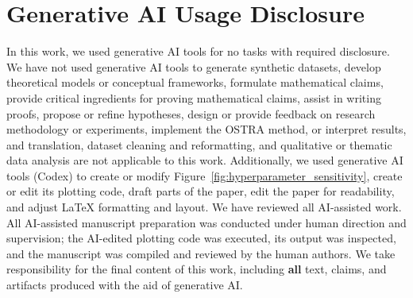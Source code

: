 \section*{Generative AI Usage Disclosure}

In this work, we used generative AI tools for no tasks with required
disclosure. We have not used generative AI tools to generate synthetic
datasets, develop theoretical models or conceptual frameworks, formulate
mathematical claims, provide critical ingredients for proving mathematical
claims, assist in writing proofs, propose or refine hypotheses, design or
provide feedback on research methodology or experiments, implement the OSTRA
method, or interpret results, and translation, dataset cleaning and
reformatting, and qualitative or thematic data analysis are not applicable to
this work. Additionally, we used generative AI tools (Codex) to create or
modify Figure~\ref{fig:hyperparameter_sensitivity}, create or edit its plotting
code, draft parts of the paper, edit the paper for readability, and adjust
\LaTeX{} formatting and layout. We have reviewed all AI-assisted work. All
AI-assisted manuscript preparation was conducted under human direction and
supervision; the AI-edited plotting code was executed, its output was
inspected, and the manuscript was compiled and reviewed by the human authors.
We take responsibility for the final content of this work, including
\textbf{all} text, claims, and artifacts produced with the aid of generative
AI.
